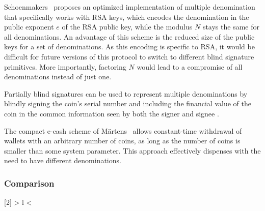 Schoenmakers~\cite{schoenmakers1997security} proposes an optimized
implementation of multiple denomination that specifically works with RSA keys,
which encodes the denomination in the public exponent $e$ of the RSA public
key, while the modulus $N$ stays the same for all denominations.  An advantage
of this scheme is the reduced size of the public keys for a set of
denominations.  As this encoding is specific to RSA, it would be difficult for
future versions of this protocol to switch to different blind signature
primitives.  More importantly, factoring $N$ would lead to a compromise of all
denominations instead of just one.

Partially blind signatures can be used to represent multiple denominations
by blindly signing the coin's serial number and including the financial value of the coin
in the common information seen by both the signer and signee \cite{abe2000provably}.

The compact e-cash scheme of Märtens~\cite{maertens2015practical} allows
constant-time withdrawal of wallets with an arbitrary number of coins, as long
as the number of coins is smaller than some system parameter.  This approach
effectively dispenses with the need to have different denominations.


\subsubsection{Comparison}

\newcommand\YES{\ding{51}} %
\newcommand\NO{\ding{55}}

\newcommand*\rot{\multicolumn{1}{R{45}{1em}}}%



\newcolumntype{R}[2]{%
    >{\bgroup}%
    l%
    <{\egroup}%
}

